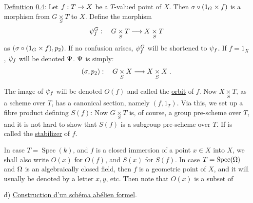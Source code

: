 
\uline{Definition} \uline{0.4}: Let $f:T\to X$ be a $T$-valued point of $X$. Then $\sigma\circ(1_G\times f)$ is a morphism from $G\underset{S}{\times}T$ to $X$. Define the morphism
\[
\psi^{G}_{f}:\quad G\underset{S}{\times}T\longrightarrow X\underset{S}{\times}T
\]
as $(\sigma\circ(1_G\times f),p_2)$. If no confusion arises, $\psi^{G}_{f}$ will be shortened to $\psi_f$. If $f=1_X$, $\psi_f$ will be denoted $\Psi$. $\Psi$ is simply:
\[
(\sigma,p_2):\quad G\underset{S}{\times}X\longrightarrow X\underset{S}{\times}X\;.
\]

The image of $\psi_f$ will be denoted $O(f)$ and called the \uline{orbit} of $f$. Now $X\underset{S}{\times}T$, as a scheme over $T$, has a canonical section, namely $(f,1_T)$. Via this, we set up a fibre product defining $S(f)$:
Now $G\underset{S}{\times}T$ is, of course, a group pre-scheme over $T$, and it is not hard to show that $S(f)$ is a subgroup pre-scheme over $T$. If is called the \uline{stabilizer} of $f$.

In case $T=\operatorname{Spec}(k)$, and $f$ is a closed immersion of a point $x\in X$ into $X$, we shall also write $O(x)$ for $O(f)$, and $S(x)$ for $S(f)$. In case $T=\operatorname{Spec}(\Omega)$ and $\Omega$ is an algebraically closed field, then $f$ is a geometric point of $X$, and it will usually be denoted by a letter $x,y$, etc. Then note that $O(x)$ is a subset of

d) \uline{Construction d'un schéma abélien formel}.


